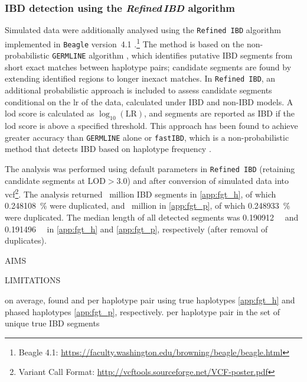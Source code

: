 %
\subsubsection{IBD detection using the \emph{Refined\,IBD} algorithm}
\label{sec:ibd_beagle_tru}
%

Simulated data were additionally analysed using the \texttt{Refined\,IBD} algorithm implemented in \texttt{Beagle} version~4.1 \citep{Browning:2013eh}.\footnote{Beagle 4.1: \url{https://faculty.washington.edu/browning/beagle/beagle.html} }
The method is based on the non-probabilistic \texttt{GERMLINE} algorithm \citep{Gusev:2009hd}, which identifies putative IBD segments from short exact matches between haplotype pairs; candidate segments are found by extending identified regions to longer inexact matches.
In \texttt{Refined\,IBD}, an additional probabilistic approach is included to assess candidate segments conditional on the \gls{lr} of the data, calculated under IBD and non-IBD models.
A \gls{lod} score is calculated as ${\log_{10}(\text{LR})}$, and segments are reported as IBD if the \gls{lod} score is above a specified threshold.
This approach has been found to achieve greater accuracy than \texttt{GERMLINE} alone or \texttt{fastIBD}, which is a non-probabilistic method that detects IBD based on haplotype frequency \citep{Browning:2011do,Browning:2013eh}.


The analysis was performed using default parameters in \texttt{Refined\,IBD} (retaining candidate segments at ${\mbox{LOD}>3.0}$) and after conversion of simulated data into \gls{vcf}\footnote{Variant Call Format: \url{http://vcftools.sourceforge.net/VCF-poster.pdf} }.
The analysis returned ~million IBD segments in \ref{app:fgt_h}, of which \SI{0.248108}{\percent} were duplicated, and ~million in \ref{app:fgt_p}, of which \SI{0.248933}{\percent} were duplicated.
The median length of all detected segments was \SI{0.190912}{\mega\basepair} and \SI{0.191496}{\mega\basepair} in \ref{app:fgt_h} and \ref{app:fgt_p}, respectively (after removal of duplicates).


AIMS

LIMITATIONS


on average, found  and  per haplotype pair using true haplotypes \ref{app:fgt_h} and phased haplotypes \ref{app:fgt_p}, respectively.
 per haplotype pair in the set of unique true IBD segments

